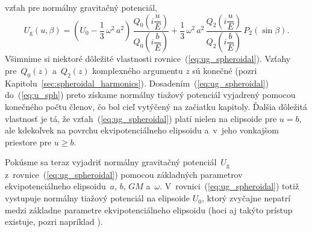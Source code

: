 \documentclass[a4paper, 12pt]{book}
\newcommand{\gidx}{\mathrm g}
\begin{document}
vzťah pre normálny gravitačný potenciál,
%
\begin{equation}
\label{eq:ug_spheroidal}
U_\gidx(u, \beta) = \left( U_0 - \frac{1}{3} \, \omega^2 \, a^2 \right) \, 
\frac{Q_0\left( i \dfrac{u}{E} \right)}{Q_0\left( i \dfrac{b}{E} \right)} 
+ \frac{1}{3} \, \omega^2 \, a^2  \, \frac{Q_2\left( i \dfrac{u}{E} 
\right)}{Q_2\left( i \dfrac{b}{E} \right)} \, P_2(\sin\beta){.}
\end{equation}
%
Všimnime si niektoré dôležité vlastnosti rovnice~(\ref{eq:ug_spheroidal}).  
Vzťahy pre~$Q_0(z)$ a~$Q_2(z)$ komplexného argumentu $z$ sú konečné (pozri 
Kapitolu~\ref{sec:spheroidal_harmonics}).  Dosadením~(\ref{eq:ug_spheroidal}) 
do~(\ref{eq:u_sph}) preto získame normálny tiažový potenciál vyjadrený pomocou 
konečného počtu členov, čo bol cieľ vytýčený na začiatku kapitoly.  Ďalšia 
dôležitá vlastnosť je tá, že vzťah~(\ref{eq:ug_spheroidal}) platí nielen na 
elipsoide pre $u = b$, ale kdekoľvek na povrchu ekvipotenciálneho elipsoidu 
a~v~jeho vonkajšom priestore pre $u \geq b$.

Pokúsme sa teraz vyjadriť normálny gravitačný potenciál~$U_\gidx$ 
z~rovnice~(\ref{eq:ug_spheroidal}) pomocou základných parametrov 
ekvipotenciálneho elipsoidu~$a$, $b$, $GM$ a~$\omega$.  
V~rovnici~(\ref{eq:ug_spheroidal}) totiž vystupuje normálny tiažový potenciál 
na elipsoide $U_0$, ktorý zvyčajne nepatrí medzi základne parametre 
ekvipotenciálneho elipsoidu (hoci aj takýto prístup existuje, pozri napríklad 
\cite{TorgeGeodesy}).
\end{document}
